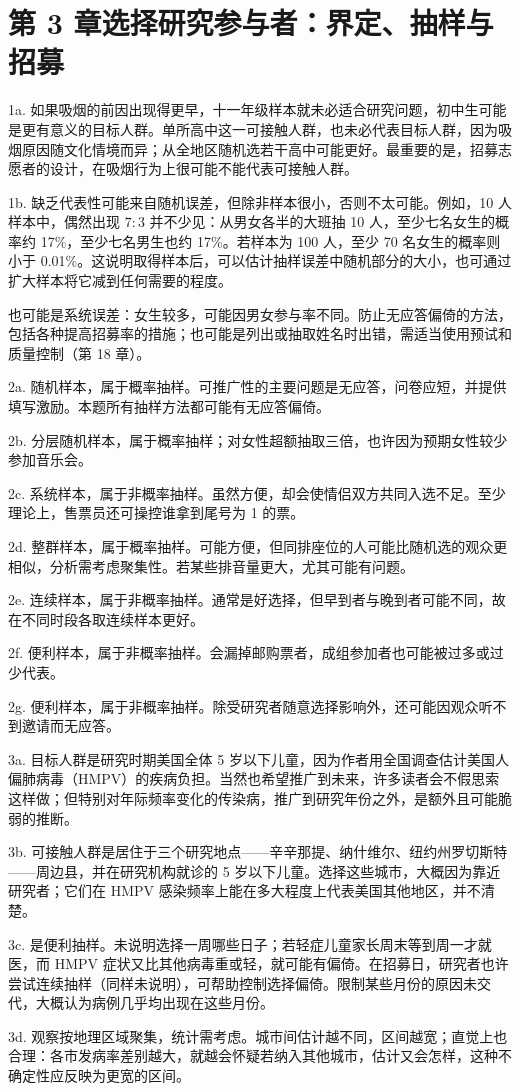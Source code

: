 \section{第 3 章\quad 选择研究参与者：界定、抽样与招募}
\begin{answerlist}
\item[1a.] 如果吸烟的前因出现得更早，十一年级样本就未必适合研究问题，初中生可能是更有意义的目标人群。单所高中这一可接触人群，也未必代表目标人群，因为吸烟原因随文化情境而异；从全地区随机选若干高中可能更好。最重要的是，招募志愿者的设计，在吸烟行为上很可能不能代表可接触人群。
\item[1b.] 缺乏代表性可能来自随机误差，但除非样本很小，否则不太可能。例如，10 人样本中，偶然出现 $7:3$ 并不少见：从男女各半的大班抽 10 人，至少七名女生的概率约 17\%，至少七名男生也约 17\%。若样本为 100 人，至少 70 名女生的概率则小于 0.01\%。这说明取得样本后，可以估计抽样误差中随机部分的大小，也可通过扩大样本将它减到任何需要的程度。

也可能是系统误差：女生较多，可能因男女参与率不同。防止无应答偏倚的方法，包括各种提高招募率的措施；也可能是列出或抽取姓名时出错，需适当使用预试和质量控制（第 18 章）。
\item[2a.] 随机样本，属于概率抽样。可推广性的主要问题是无应答，问卷应短，并提供填写激励。本题所有抽样方法都可能有无应答偏倚。
\item[2b.] 分层随机样本，属于概率抽样；对女性超额抽取三倍，也许因为预期女性较少参加音乐会。
\item[2c.] 系统样本，属于非概率抽样。虽然方便，却会使情侣双方共同入选不足。至少理论上，售票员还可操控谁拿到尾号为 1 的票。
\item[2d.] 整群样本，属于概率抽样。可能方便，但同排座位的人可能比随机选的观众更相似，分析需考虑聚集性。若某些排音量更大，尤其可能有问题。
\item[2e.] 连续样本，属于非概率抽样。通常是好选择，但早到者与晚到者可能不同，故在不同时段各取连续样本更好。
\item[2f.] 便利样本，属于非概率抽样。会漏掉邮购票者，成组参加者也可能被过多或过少代表。
\item[2g.] 便利样本，属于非概率抽样。除受研究者随意选择影响外，还可能因观众听不到邀请而无应答。
\item[3a.] 目标人群是研究时期美国全体 5 岁以下儿童，因为作者用全国调查估计美国人偏肺病毒（HMPV）的疾病负担。当然也希望推广到未来，许多读者会不假思索这样做；但特别对年际频率变化的传染病，推广到研究年份之外，是额外且可能脆弱的推断。
\item[3b.] 可接触人群是居住于三个研究地点——辛辛那提、纳什维尔、纽约州罗切斯特——周边县，并在研究机构就诊的 5 岁以下儿童。选择这些城市，大概因为靠近研究者；它们在 HMPV 感染频率上能在多大程度上代表美国其他地区，并不清楚。
\item[3c.] 是便利抽样。未说明选择一周哪些日子；若轻症儿童家长周末等到周一才就医，而 HMPV 症状又比其他病毒重或轻，就可能有偏倚。在招募日，研究者也许尝试连续抽样（同样未说明），可帮助控制选择偏倚。限制某些月份的原因未交代，大概认为病例几乎均出现在这些月份。
\item[3d.] 观察按地理区域聚集，统计需考虑。城市间估计越不同，区间越宽；直觉上也合理：各市发病率差别越大，就越会怀疑若纳入其他城市，估计又会怎样，这种不确定性应反映为更宽的区间。


\end{answerlist}
